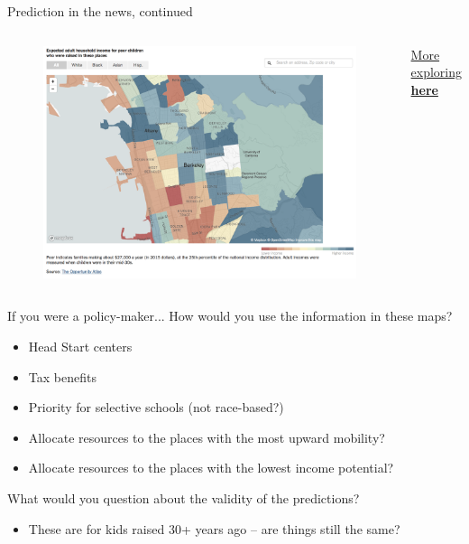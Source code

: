 \documentclass[aspectratio=169]{beamer}
\begin{document}
\begin{frame}{Prediction in the news, continued}

\begin{columns}
\begin{figure}
\includegraphics[height=0.8\textheight]{opportunityatlas}
\caption*{}
\end{figure}
\href{https://www.nytimes.com/2018/10/01/upshot/maps-neighborhoods-shape-child-poverty.html}{More exploring \textbf{here}}
\end{columns}
\end{frame}

\begin{frame}{If you were a policy-maker...}
How would you use the information in these maps?

\begin{itemize}
  \item Head Start centers
  \item Tax benefits
  \item Priority for selective schools (not race-based?)
  \item Allocate resources to the places with the most upward mobility?
  \item Allocate resources to the places with the lowest income potential?
\end{itemize}

What would you question about the validity of the predictions?
\begin{itemize}
  \item These are for kids raised 30+ years ago -- are things still the same?
\end{itemize}
\end{frame}
\end{document}
